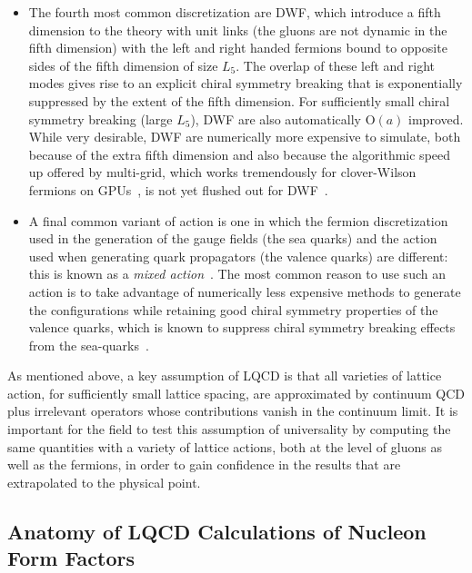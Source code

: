 \documentclass{ar-1col}
\begin{document}
\begin{itemize}[leftmargin=*]
\item The fourth most common discretization are DWF, which introduce a fifth dimension to the theory with unit links (the gluons are not dynamic in the fifth dimension) with the left and right handed fermions bound to opposite sides of the fifth dimension of size $L_5$.  The overlap of these left and right modes gives rise to an explicit chiral symmetry breaking that is exponentially suppressed by the extent of the fifth dimension.  For sufficiently small chiral symmetry breaking (large $L_5$), DWF are also automatically $\mathrm{O}(a)$ improved.
While very desirable, DWF are numerically more expensive to simulate, both because of the extra fifth dimension and also because the algorithmic speed up offered by multi-grid, which works tremendously for clover-Wilson fermions on GPUs~\cite{Clark:2016rdz}, is not yet flushed out for DWF~\cite{Boyle:2014rwa,Cohen:2011ivh,Yamaguchi:2016kop,Brower:2020xmc,Boyle:2021wcf}.

\item A final common variant of action is one in which the fermion discretization used in the generation of the gauge fields (the sea quarks) and the action used when generating quark propagators (the valence quarks) are different: this is known as a \textit{mixed action}~\cite{Renner:2004ck}.
The most common reason to use such an action is to take advantage of numerically less expensive methods to generate the configurations while retaining good chiral symmetry properties of the valence quarks, which is known to suppress chiral symmetry breaking effects from the sea-quarks~\cite{Bar:2002nr,Bar:2005tu,Tiburzi:2005is,Chen:2007ug}.

\end{itemize}
As mentioned above, a key assumption of LQCD is that all varieties of lattice action, for sufficiently small lattice spacing, are approximated by continuum QCD plus irrelevant operators whose contributions vanish in the continuum limit.
It is important for the field to test this assumption of universality by computing the same quantities with a variety of lattice actions, both at the level of gluons as well as the fermions, in order to gain confidence in the results that are extrapolated to the physical point.


\subsection{Anatomy of LQCD Calculations of Nucleon Form Factors\label{sec:calc_anatomy}}
\end{document}
